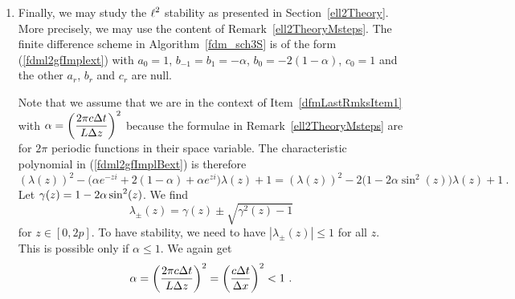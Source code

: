 \begin{rmkList}
\begin{enumerate}
For instance, for the finite difference scheme in
Algorithm~\ref{fdm_sch3S} which is considered in the present section,
if we substitute $\DS w_{s,j} = \lambda^j e^{(2\pi k x_s/L) i}$
in (\ref{fdm_sch3S}) \footnote{Where the index $i$ is replaced by $s$
because $i$ is presently used as the complex number such that
$\DS i^2=-1$.}, we get
\begin{align*}
0 & = \lambda^{j+1} e^{(2\pi k x_s/L) i}
- 2 \lambda^j e^{(2\pi k x_s/L) i} + \lambda^{j-1} e^{(2\pi k x_s/L) i} \\
&\qquad - \alpha \left( \lambda^j e^{(2\pi k(x_s +\dtx{x})/L) i}
- 2 \lambda^j e^{(2\pi k x_s/L) i}
+ \lambda^j e^{(2\pi (x_s-\dtx{x})/L) i} \right) \ .
\end{align*}
If we divide by $\DS \lambda^{j-1} e^{(2\pi k x_s/L) i}$, we get
\begin{align}
0 & = \lambda^2 - 2 \lambda + 1 - \alpha \left( e^{(2\pi k \dtx{x}/L) i} - 2
+ e^{-(2\pi k \dtx{x}/L) i} \right) \lambda \nonumber \\
& = \lambda^2 - 2 \left(1 - 2 \alpha \sin^2\left( \frac{\pi k \dtx{x}}{L}\right)
\right) \lambda + 1 \ . \label{sch3D_EigRoot}
\end{align}
This is $p_k(\lambda) = 0$ with $p_k$ defined in (\ref{fdmgfL2Cext})
because the substitution $z = 2\pi x /L$ yields
$\DS \dtx{z} =  2 \pi \dtx{x}/L$.
\item Finally, we may study the $\displaystyle \ell^2$ stability as presented in
Section~\ref{ell2Theory}.  More precisely, we may use the content of
Remark~\ref{ell2TheoryMsteps}.  The finite difference scheme in
Algorithm~\ref{fdm_sch3S} is of the form (\ref{fdml2gfImplext}) with
$a_0 =1$, $b_{-1}= b_1 = -\alpha$, $b_0 = -2(1-\alpha)$, $c_0 = 1$ and
the other $a_r$, $b_r$ and $c_r$ are null.    \label{dfmLastRmksItem4}

Note that we assume that we are in the context of
Item~\ref{dfmLastRmksItem1} with 
$\displaystyle \alpha = \left(\frac{2\pi c \Delta{t}}{L \Delta{z}}\right)^2$
because the formulae in Remark~\ref{ell2TheoryMsteps} are for $2\pi$
periodic functions in their space variable.  The characteristic
polynomial in (\ref{fdml2gfImplBext}) is therefore
\[
\left(\lambda(z)\right)^2 - \big(\alpha e^{-zi} + 2(1-\alpha) +
\alpha e^{zi}\big) \lambda(z) + 1
= \left(\lambda(z)\right)^2 - 2\big(1 -2 \alpha \sin^2(z)\big)
\lambda(z) + 1 \ .
\]
Let $\displaystyle \gamma(z) = 1 -2 \alpha \sin^2(z)$.  We find
\[
  \lambda_{\pm}(z) = \gamma(z) \pm \sqrt{\gamma^2(z)-1}
\]
for $z \in [0,2p]$.  To have stability, we need to have
$|\lambda_{\pm}(z)| \leq 1$ for all $z$.  This is possible only if
$\alpha \leq 1$.   We again get
\[
  \alpha = \left(\frac{2\pi c \dtx{t}}{L \dtx{z}}\right)^2
  = \left( \frac{c \dtx{t}}{\dtx{x}}\right)^2 < 1 \ .
\]
\end{enumerate}
\end{rmkList}

